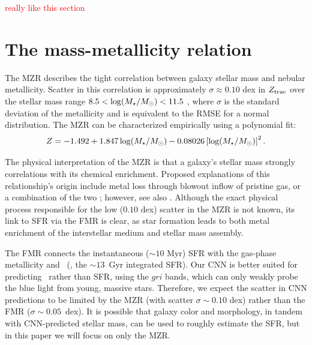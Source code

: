 \documentclass[fleqn,usenatbib]{mnras}
\newcommand{\editorial}[1]{\textcolor{red}{#1}}
\begin{document}
\editorial{really like this section}

\section{The mass-metallicity relation} \label{sec:MZR}
The MZR describes the tight correlation between galaxy stellar mass and nebular metallicity. Scatter in this correlation is approximately $\sigma \approx 0.10$ dex in $Z_{\rm true}$ over the stellar mass range $8.5 < \log (\hbox{$M_{\star}$} / \hbox{$M_\odot$}) < 11.5$ \citep{Tremonti2004}, where $\sigma$ is the standard deviation of the metallicity and is equivalent to the RMSE for a normal distribution. The MZR can be characterized empirically using a polynomial fit:
\begin{equation}\label{eq:mzr}
Z = -1.492 + 1.847 \log (\hbox{$M_{\star}$} / \hbox{$M_\odot$}) - 0.08026 \left [\log(\hbox{$M_{\star}$} / \hbox{$M_\odot$})\right ]^2.
\end{equation}

The physical interpretation of the MZR is that a galaxy's stellar mass strongly correlations with its chemical enrichment. Proposed explanations of this relationship's origin include metal loss through blowout \citep[e.g.,][]{2002ApJ...581.1019G,Tremonti2004} inflow of pristine gas, or a combination of the two \citep[][]{2013ApJ...772..119L}; however, see also \cite{2013A&A...554A..58S}. Although the exact physical process responsible for the low ($0.10$ dex) scatter in the MZR is not known, its link to SFR via the FMR is clear, as star formation leads to both metal enrichment of the interstellar medium and stellar mass assembly.

The FMR connects the instantaneous ($\sim 10$ Myr) SFR with the gas-phase metallicity \citep[$\sim 1$~Gyr timescales; see, e.g.,][]{2011ApJ...734...48L} and \mstar\ (\ie, the $\sim 13$~Gyr integrated SFR). Our CNN is better suited for predicting \mstar\ rather than SFR, using the $gri$ bands, which can only weakly probe the blue light from young, massive stars. Therefore, we expect the scatter in CNN predictions to be limited by the MZR (with scatter $\sigma \sim 0.10$ dex) rather than the FMR ($\sigma \sim 0.05$~dex). It is possible that galaxy color and morphology, in tandem with CNN-predicted stellar mass, can be used to roughly estimate the SFR, but in this paper we will focus on only the MZR.

\end{document}
